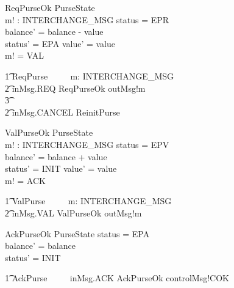 \documentclass{article}
\begin{document}
\begin{schema}{ReqPurseOk}
     \Delta PurseState \\
     m! : INTERCHANGE\_MSG
\where
      status = EPR \\
      balance' = balance - value \\
      status' = EPA \land value' = value \\
      m! = VAL
\end{schema}

\begin{circusaction}
    \t1 ReqPurse ~~\circdef~~  \circvar m: INTERCHANGE\_MSG \circspot \\
		\t2 inMsg.REQ \then  \lschexpract ReqPurseOk \rschexpract \circseq outMsg!m \then \Skip \\
				\t3 \extchoice \\
		\t2 inMsg.CANCEL \then \lschexpract ReinitPurse \rschexpract
\end{circusaction}

\begin{schema}{ValPurseOk}
     \Delta PurseState \\
     m! : INTERCHANGE\_MSG
\where
      status = EPV \\
      balance' = balance + value \\
      status' = INIT \land value' = value \\
      m! = ACK
\end{schema}

\begin{circusaction}
    \t1 ValPurse ~~\circdef~~  \circvar m: INTERCHANGE\_MSG \circspot \\
		\t2 inMsg.VAL \then  \lschexpract ValPurseOk \rschexpract \circseq outMsg!m \then \Skip
\end{circusaction}

\begin{schema}{AckPurseOk}
     \Delta PurseState
\where
      status = EPA \\
      balance' = balance \\
      status' = INIT
\end{schema}

\begin{circusaction}
    \t1 AckPurse ~~\circdef~~  inMsg.ACK \then  \lschexpract AckPurseOk \rschexpract \circseq controlMsg!COK \then \Skip
\end{circusaction}
\end{document}
